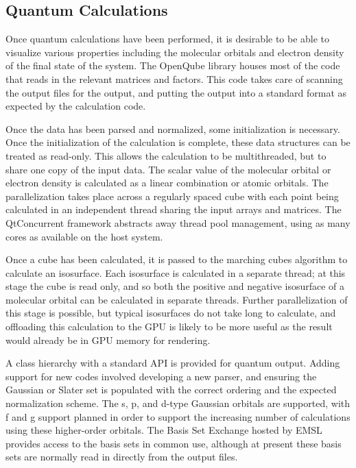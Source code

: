 \documentclass[10pt]{bmc_article}
\newenvironment{bmcformat}{\begin{raggedright}
\baselineskip20pt\sloppy\setboolean{publ}{false}}{\end{raggedright}
\baselineskip20pt\sloppy}
\begin{document}
\begin{bmcformat}
\section{Quantum Calculations} %

Once quantum calculations have been performed, it is desirable to be able
to visualize various properties including the molecular orbitals and electron
density of the final state of the system. The OpenQube library houses most of
the code that reads in the relevant matrices and factors. This code takes
care of scanning the output files for the output, and putting the output into a
standard format as expected by the calculation code.

Once the data has been parsed and normalized, some initialization is
necessary. Once the initialization of the calculation is complete, these data
structures can be treated as read-only. This allows the calculation to be
multithreaded, but to share one copy of the input data. The scalar value of
the molecular orbital or electron density is calculated as a linear combination
or atomic orbitals. The parallelization takes place across a regularly spaced
cube with each point being calculated in an independent thread sharing
the input arrays and matrices. The QtConcurrent framework abstracts away
thread pool management, using as many cores as available on the host system.

Once a cube has been calculated, it is passed to the marching cubes
algorithm to calculate an isosurface. Each isosurface is calculated in a separate
thread; at this stage the cube is read only, and so both the positive and negative
isosurface of a molecular orbital can be calculated in separate threads. Further
parallelization of this stage is possible, but typical isosurfaces do not take long
to calculate, and offloading this calculation to the GPU is likely to be more useful
as the result would already be in GPU memory for rendering.

A class hierarchy with a standard API is provided for quantum output. Adding
support for new codes involved developing a new parser, and ensuring the
Gaussian or Slater set is populated with the correct ordering and the expected
normalization scheme. The s, p, and d-type Gaussian orbitals are supported,
with f and g support planned in order to support the increasing number of
calculations using these higher-order orbitals. The Basis Set Exchange hosted
by EMSL provides access to the basis sets in common use, although at present
these basis sets are normally read in directly from the output files.


\end{bmcformat}
\end{document}
